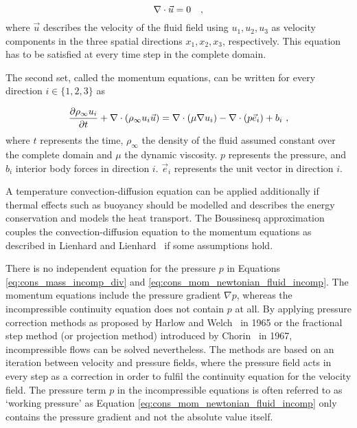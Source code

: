 \documentclass[10pt, conference, compsocconf]{IEEEtran}
\newcommand{\partAbl}[2]{\frac{\partial #1}{\partial #2}}
\begin{document}
\begin{equation}
\label{eq:cons_mass_incomp_div}
\nabla \cdot \vec u = 0 \quad ,\vspace{-2pt}
\end{equation}
where $\vec u$ describes the velocity of the fluid field using $u_1,u_2,u_3$ as velocity components in the three spatial directions $x_1,x_2,x_3$, respectively. This equation has to be satisfied at every time step in the complete domain. 

The second set, called the momentum equations, can be written for every direction $i \in \{1,2,3\}$ as \vspace{-6pt}

\begin{equation}
\label{eq:cons_mom_newtonian_fluid_incomp}
\partAbl{\rho_\infty u_i}{t} + \nabla \cdot (\rho_\infty u_i \vec u) = \nabla \cdot \left( \mu \nabla u_i \right) - \nabla \cdot \left(p \vec e_i \right) + b_i ~,
\vspace{6pt}
\end{equation}
where $t$ represents the time, $\rho_\infty$ the density of the fluid assumed constant over the complete domain and $\mu$ the dynamic viscosity. $p$ represents the pressure, and $b_i$ interior body forces in direction $i$. $\vec e_i$ represents the unit vector in direction $i$.

A temperature convection-diffusion equation can be applied additionally if thermal effects such as buoyancy should be modelled and describes the energy conservation and models the heat transport. The  Boussinesq approximation couples the convection-diffusion equation to the momentum equations as described in Lienhard and Lienhard~\cite{Lienhard2011} if some assumptions hold.

There is no independent equation for the pressure $p$ in Equations \eqref{eq:cons_mass_incomp_div} and \eqref{eq:cons_mom_newtonian_fluid_incomp}. The momentum equations include the pressure gradient $\nabla p$, whereas the incompressible continuity equation does not contain $p$ at all. By applying pressure correction methods as proposed by Harlow and Welch~\cite{HarlowWelch1965} in 1965 or the fractional step method (or projection method) introduced by Chorin~\cite{Chorin1967} in 1967, incompressible flows can be solved nevertheless. The methods are based on an iteration between velocity and pressure fields, where the pressure field acts in every step as a correction in order to fulfil the continuity equation for the velocity field. The pressure term $p$ in the incompressible equations is often referred to as `working pressure' as Equation \eqref{eq:cons_mom_newtonian_fluid_incomp} only contains the pressure gradient and not the absolute value itself.
\end{document}
